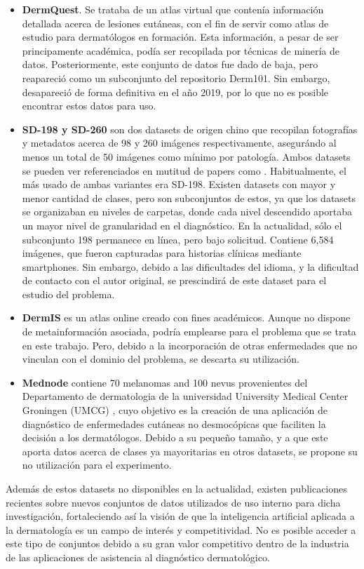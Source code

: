 \begin{itemize}
	\item \textbf{DermQuest}. Se trataba de un atlas virtual que contenía información detallada acerca de lesiones cutáneas, con el fin de servir como atlas de estudio para dermatólogos en formación. Esta información, a pesar de ser principamente académica, podía ser recopilada por técnicas de minería de datos.  Posteriormente, este conjunto de datos fue dado de baja, pero reapareció como un subconjunto del repositorio Derm101. Sin embargo, desapareció de forma definitiva en el año 2019, por lo que no es posible encontrar estos datos para uso.
	
	\item \textbf{SD-198 y SD-260}  \cite{10.1007/978-3-319-46466-4_13} son dos datasets de origen chino que recopilan fotografías y metadatos acerca de  98 y 260 imágenes respectivamente, asegurándo al menos un total de 50 imágenes como mínimo por patología. Ambos datasets se pueden ver referenciados en mutitud de papers como \cite{goyal2020artificial}. Habitualmente, el más usado de ambas variantes era SD-198. Existen datasets con mayor y menor cantidad de clases, pero son subconjuntos de estos, ya que los datasets se organizaban en niveles de carpetas, donde cada nivel descendido aportaba un mayor nivel de granularidad en el diagnóstico. En la actualidad, sólo el subconjunto 198 permanece en línea, pero bajo solicitud. Contiene 6,584 imágenes, que fueron capturadas para historias clínicas mediante smartphones. Sin embargo, debido a las dificultades del idioma, y la dificultad de contacto con el autor original, se prescindirá de este dataset para el estudio del problema.
	\item \textbf{DermIS} \cite {dermis} es un atlas online creado con fines académicos. Aunque no dispone de metainformación asociada, podría emplearse para el  problema que se trata en este trabajo. Pero, debido a la incorporación de otras enfermedades que no vinculan con el dominio del problema, se descarta su utilización.
	\item \textbf{Mednode} \cite{GIOTIS20156578} contiene 70 melanomas and 100 nevus provenientes del  Departamento de dermatologia de la universidad University Medical Center Groningen (UMCG) , cuyo objetivo es la creación de una aplicación de diagnóstico de enfermedades cutáneas no desmocópicas que faciliten la decisión a los dermatólogos. Debido a su pequeño tamaño, y a que este aporta datos acerca de clases ya mayoritarias en otros datasets, se propone su no utilización para el experimento.
\end{itemize}

Además de estos datasets no disponibles en la actualidad, existen publicaciones recientes sobre nuevos conjuntos de datos utilizados de uso interno para dicha investigación, fortaleciendo así la visión de que la inteligencia artificial aplicada a la dermatología es un campo de interés y competitividad. No es posible acceder a este tipo de conjuntos debido a su gran valor competitivo dentro de la industria  de las aplicaciones de asistencia al diagnóstico dermatológico.